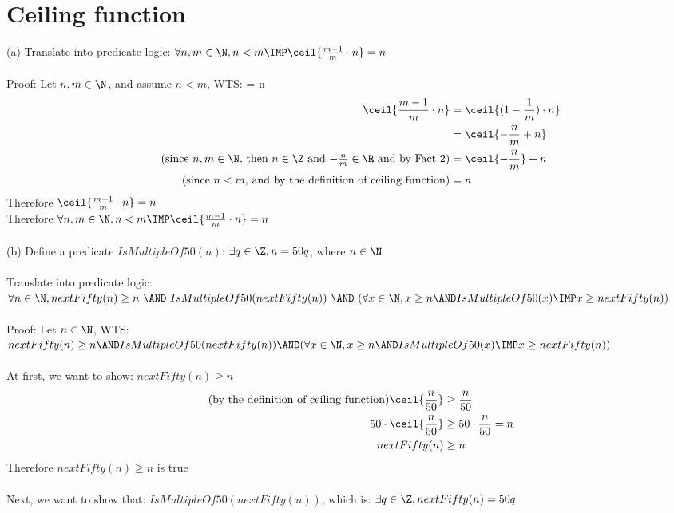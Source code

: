 \documentclass[12pt]{article}
\begin{document}
\section{Ceiling function}
(a) Translate into predicate logic: $\forall n,m \in \N, n < m \IMP \ceil{\frac{m - 1}{m} \cdot n} = n$\\
\\
Proof: Let $n,m \in \N$, and assume $n < m$, WTS:  = n
\newpage
\begin{align*}
    \ceil{\frac{m - 1}{m} \cdot n} &= \ceil{(1 - \frac{1}{m}) \cdot n}\\
    &= \ceil{-\frac{n}{m} + n}\\
    \tag{since $n,m \in \N$, then $n \in \Z$ and $-\frac{n}{m} \in \R$ and by Fact 2}
    &= \ceil{-\frac{n}{m}} + n\\
    \tag{since $n < m$, and by the definition of ceiling function}
    &= n
\end{align*}
Therefore $\ceil{\frac{m - 1}{m} \cdot n} = n$\\
Therefore $\forall n,m \in \N, n < m \IMP \ceil{\frac{m - 1}{m} \cdot n} = n$\\
\\
(b) Define a predicate $IsMultipleOf50(n)$: $\exists q \in \Z, n = 50q$, where $n \in \N$\\
\\
Translate into predicate logic: $\forall n \in \N, nextFifty(n) \ge n \ \AND \ IsMultipleOf50(nextFifty(n)) \ \AND\ (\forall x \in \N,x \ge n \AND IsMultipleOf50(x) \IMP x \ge nextFifty(n))$\\
\\
Proof: Let $n \in \N$, WTS: $nextFifty(n) \ge n \AND IsMultipleOf50(nextFifty(n)) \AND (\forall x \in \N,x \ge n \AND IsMultipleOf50(x) \IMP x \ge nextFifty(n))$\\
\\
At first, we want to show: $nextFifty(n) \ge n$
\begin{align*}
    \tag{by the definition of ceiling function}
    \ceil{\frac{n}{50}} &\ge \frac{n}{50}\\
    50 \cdot \ceil{\frac{n}{50}} &\ge 50 \cdot \frac{n}{50} = n\\
    nextFifty(n) &\ge n
\end{align*}
Therefore $nextFifty(n) \ge n$ is true\\
\\
Next, we want to show that: $IsMultipleOf50(nextFifty(n))$, which is: $\exists q \in \Z, nextFifty(n) = 50q$\\
\end{document}
